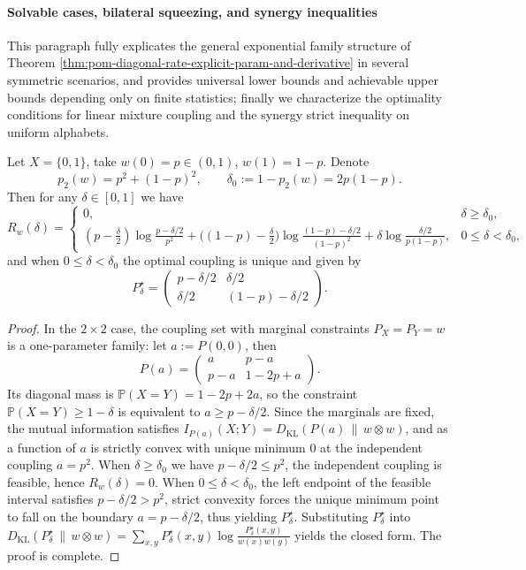 
\paragraph{Solvable cases, bilateral squeezing, and synergy inequalities}
This paragraph fully explicates the general exponential family structure of Theorem \ref{thm:pom-diagonal-rate-explicit-param-and-derivative} in several symmetric scenarios, and provides universal lower bounds and achievable upper bounds depending only on finite statistics; finally we characterize the optimality conditions for linear mixture coupling and the synergy strict inequality on uniform alphabets.

\begin{theorem}\label{thm:pom-diagonal-rate-binary-closed-form}
Let \(X=\{0,1\}\), take \(w(0)=p\in(0,1)\), \(w(1)=1-p\).
Denote
\[
p_2(w)=p^2+(1-p)^2,\qquad \delta_0:=1-p_2(w)=2p(1-p).
\]
Then for any \(\delta\in[0,1]\) we have
\[
R_w(\delta)=
\begin{cases}
0, & \delta\ge \delta_0,\\[4pt]
\displaystyle (p-\tfrac{\delta}{2})\log\frac{p-\delta/2}{p^2}
+\bigl((1-p)-\tfrac{\delta}{2}\bigr)\log\frac{(1-p)-\delta/2}{(1-p)^2}
+\delta\log\frac{\delta/2}{p(1-p)}, & 0\le \delta<\delta_0,
\end{cases}
\]
and when \(0\le\delta<\delta_0\) the optimal coupling is unique and given by
\[
P^\star_\delta=
\begin{pmatrix}
p-\delta/2 & \delta/2\\
\delta/2 & (1-p)-\delta/2
\end{pmatrix}.
\]
\end{theorem}
\begin{proof}
In the \(2\times 2\) case, the coupling set with marginal constraints \(P_X=P_Y=w\) is a one-parameter family:
let \(a:=P(0,0)\), then
\[
P(a)=
\begin{pmatrix}
a & p-a\\
p-a & 1-2p+a
\end{pmatrix}.
\]
Its diagonal mass is \(\mathbb P(X=Y)=1-2p+2a\), so the constraint \(\mathbb P(X=Y)\ge 1-\delta\) is equivalent to \(a\ge p-\delta/2\).
Since the marginals are fixed, the mutual information satisfies \(I_{P(a)}(X;Y)=D_{\mathrm{KL}}(P(a)\,\|\,w\otimes w)\), and as a function of \(a\) is strictly convex with unique minimum \(0\) at the independent coupling \(a=p^2\).
When \(\delta\ge \delta_0\) we have \(p-\delta/2\le p^2\), the independent coupling is feasible, hence \(R_w(\delta)=0\).
When \(0\le \delta<\delta_0\), the left endpoint of the feasible interval satisfies \(p-\delta/2>p^2\), strict convexity forces the unique minimum point to fall on the boundary \(a=p-\delta/2\), thus yielding \(P^\star_\delta\).
Substituting \(P^\star_\delta\) into \(D_{\mathrm{KL}}(P^\star_\delta\,\|\,w\otimes w)=\sum_{x,y}P^\star_\delta(x,y)\log\frac{P^\star_\delta(x,y)}{w(x)w(y)}\) yields the closed form. The proof is complete.
\end{proof}


